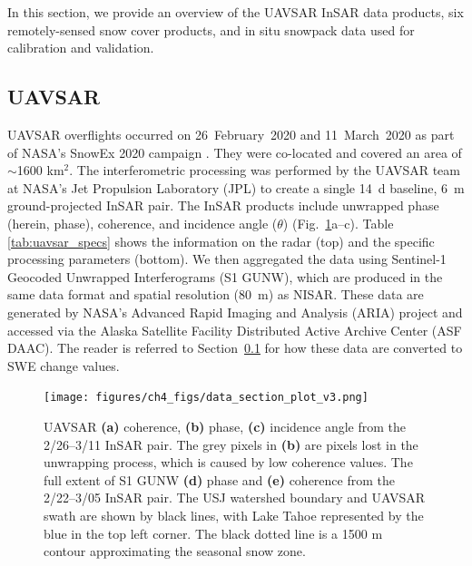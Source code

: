 In this section, we provide an overview of the UAVSAR InSAR data products, six remotely-sensed snow cover products, and in situ snowpack data used for calibration and validation.

\hypertarget{ch4-methods-1}{\subsection{UAVSAR}\label{ch4-methods-1}}

UAVSAR overflights occurred on 26~February~2020 and 11~March~2020 as part of NASA's SnowEx 2020 campaign \citep{marshallNASASnowEx20202019}. They were co-located and covered an area of $\sim$1600 km$^{2}$. The interferometric processing was performed by the UAVSAR team at NASA's Jet Propulsion Laboratory (JPL) to create a single 14~d baseline, 6~m ground-projected InSAR pair. The InSAR products include unwrapped phase (herein, phase), coherence, and incidence angle ($\theta$) (Fig.~\ref{fig:uavsar_cor_inc_phase_plot}a--c). Table \ref{tab:uavsar_specs} shows the information on the radar (top) and the specific processing parameters (bottom). We then aggregated the data using Sentinel-1 Geocoded Unwrapped Interferograms (S1 GUNW), which are produced in the same data format and spatial resolution (80~m) as NISAR. These data are generated by NASA's Advanced Rapid Imaging and Analysis (ARIA) \citep{bekaertDevelopmentDisseminationStandardized2019,buzzangaSustainedMonitoringSubsidence2020} project and accessed via the Alaska Satellite Facility Distributed Active Archive Center (ASF DAAC). The reader is referred to Section~\ref{ch4-methods-1} for how these data are converted to SWE change values.

\begin{figure}[ht]
\texttt{[image: figures/ch4\_figs/data\_section\_plot\_v3.png]}
\centering
\caption{UAVSAR \textbf{(a)} coherence, \textbf{(b)} phase, \textbf{(c)} incidence angle from the 2/26--3/11 InSAR pair. The grey pixels in \textbf{(b)} are pixels lost in the unwrapping process, which is caused by low coherence values. The full extent of S1 GUNW \textbf{(d)} phase and \textbf{(e)} coherence from the 2/22--3/05 InSAR pair. The USJ watershed boundary and UAVSAR swath are shown by black lines, with Lake Tahoe represented by the blue in the top left corner. The black dotted line is a 1500 m contour approximating the seasonal snow zone.}
\label{fig:uavsar_cor_inc_phase_plot}
\end{figure}


